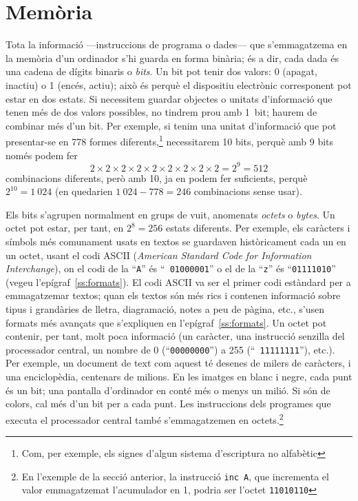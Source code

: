 \section{Memòria}
\label{ss:memoria}

Tota la informació ---instruccions de programa o dades--- que
s'emmagatzema en la memòria d'un ordinador s'hi guarda en forma
binària; és a dir, cada dada és una cadena de dígits binaris o
\emph{bits}. Un bit pot tenir dos valors: 0 (apagat, inactiu) o 1
(encés, actiu); això és perquè el dispositiu electrònic corresponent
pot estar en dos estats. Si necessitem guardar objectes o unitats
d'informació que tenen més de dos valors possibles, no tindrem prou
amb 1~bit; haurem de combinar més d'un bit. Per exemple, si tenim una
unitat d'informació que pot presentar-se en 778 formes
diferents,\footnote{Com, per exemple, els signes d'algun sistema
  d'escriptura no alfabètic} necessitarem 10 bits, perquè amb 9 bits
només podem fer $$2 \times 2 \times 2 \times 2 \times 2 \times 2
\times 2 \times 2 \times 2 = 2^9 = 512$$ combinacions diferents, però
amb 10, ja en podem fer suficients, perquè $2^{10}=1~024$ (en
quedarien $1~024-778=246$ combinacions sense usar).

Els bits s'agrupen normalment en grups de vuit, anomenats {\em octets}
o \emph{bytes}. Un octet pot estar, per tant, en $2^8=256$ estats
diferents. Per exemple, els caràcters i símbols més comunament usats
en textos se guardaven històricament cada un en un octet, usant el
codi ASCII\label{pg:ASCII} (\emph{American Standard Code for
  Information Interchange}), on el codi de la ``{\tt A}'' és ``{\tt
  01000001}'' o el de la ``{\tt z}'' és ``{\tt 01111010}'' (vegeu
l'epígraf~\ref{ss:formats}).  El codi ASCII va ser el primer codi
estàndard per a emmagatzemar textos; quan els textos són més rics i
contenen informació sobre tipus i grandàries de lletra, diagramació,
notes a peu de pàgina, etc., s'usen formats més avançats que
s'expliquen en l'epígraf~\ref{ss:formats}.  Un octet pot contenir, per
tant, molt poca informació (un caràcter, una instrucció senzilla del
processador central, un nombre de 0 (``{\tt 00000000}'') a 255 (``{\tt
  11111111}''), etc.).  Per exemple, un document de text com aquest té
desenes de milers de caràcters, i una enciclopèdia, centenars de
milions. En les imatges en blanc i negre, cada punt és un bit; una
pantalla d'ordinador en conté més o menys un milió. Si són de colors,
cal més d'un bit per a cada punt. Les instruccions dels programes que
executa el processador central també s'emmagatzemen en
octets.\footnote{En l'exemple de la secció anterior, la instrucció
  {\tt inc A}, que incrementa el valor emmagatzemat l'acumulador en 1,
  podria ser l'octet {\tt 11010110}}

